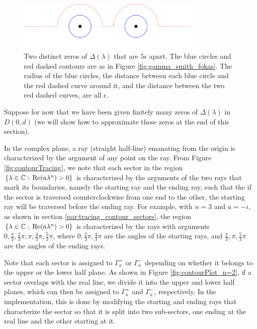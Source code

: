 \documentclass[12pt, oneside, a4paper]{article}
\begin{document}
\begin{figure}[htpb!]
    \centering
    \includegraphics[width=0.8\textwidth]{epsilon_ps.png}
    \caption{Two distinct zeros of $\Delta(\lambda)$ that are $5\epsilon$ apart. The blue circles and red dashed contours are as in Figure \ref{fig:gamma_smith_fokas}. The radius of the blue circles, the distance between each blue circle and the red dashed curve around it, and the distance between the two red dashed curves, are all $\epsilon$.}
    \label{fig:epsilon}
\end{figure}

Suppose for now that we have been given finitely many zeros of $\Delta(\lambda)$ in $D(0, d)$ (we will show how to approximate these zeros at the end of this section).

In the complex plane, a ray (straight half-line) emanating from the origin is characterized by the argument of any point on the ray. From Figure \ref{fig:contourTracing}, we note that each sector in the region $\{\lambda\in\mathbb C:\, \mathrm{Re}(a\lambda^n)>0\}$ is characterized by the arguments of the two rays that mark its boundaries, namely the starting ray and the ending ray, such that the if the sector is traversed counterclockwise from one end to the other, the starting ray will be traversed before the ending ray. For example, with $n=3$ and $a=-i$, as shown in section \ref{par:tracing_contour_sectors}, the region $\{\lambda\in\mathbb C:\, \mathrm{Re}(a\lambda^n)>0\}$ is characterized by the rays with arguments $0, \frac{\pi}{3}, \frac{2}{3}\pi, \pi, \frac{4}{3}\pi, \frac{5}{3}\pi$, where $0, \frac{2}{3}\pi, \frac{4}{3}\pi$ are the angles of the starting rays, and $\frac{\pi}{3}, \pi, \frac{5}{3}\pi$ are the angles of the ending rays. 

Note that each sector is assigned to $\Gamma_a^+$ or $\Gamma_a^-$ depending on whether it belongs to the upper or the lower half plane. As shown in Figure \ref{fig:contourPlot_n=2}, if a sector overlaps with the real line, we divide it into the upper and lower half planes, which can then be assigned to $\Gamma_a^+$ and $\Gamma_a^-$, respectively. In the implementation, this is done by modifying the starting and ending rays that characterize the sector so that it is split into two sub-sectors, one ending at the real line and the other starting at it.
\end{document}
